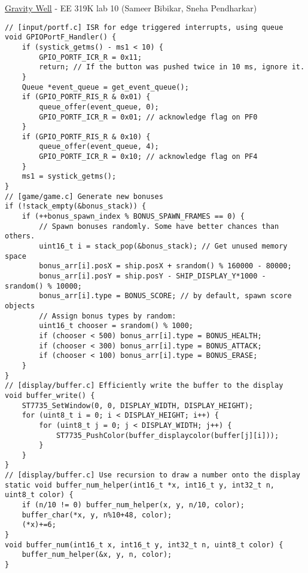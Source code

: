 \documentclass[12pt]{article}
\begin{document}
\large{\underline{Gravity Well} - EE 319K lab 10 (Sameer Bibikar, Sneha Pendharkar)}
\lstset{basicstyle=\normalsize\ttfamily,language=C,breaklines=true,columns=fullflexible,keepspaces=true}
\begin{lstlisting}
// [input/portf.c] ISR for edge triggered interrupts, using queue
void GPIOPortF_Handler() {
	if (systick_getms() - ms1 < 10) {
		GPIO_PORTF_ICR_R = 0x11;
		return; // If the button was pushed twice in 10 ms, ignore it.
	}
	Queue *event_queue = get_event_queue();
	if (GPIO_PORTF_RIS_R & 0x01) {
		queue_offer(event_queue, 0);
		GPIO_PORTF_ICR_R = 0x01; // acknowledge flag on PF0
	}
	if (GPIO_PORTF_RIS_R & 0x10) {
		queue_offer(event_queue, 4);
		GPIO_PORTF_ICR_R = 0x10; // acknowledge flag on PF4
	}
	ms1 = systick_getms();
}
// [game/game.c] Generate new bonuses
if (!stack_empty(&bonus_stack)) {
	if (++bonus_spawn_index % BONUS_SPAWN_FRAMES == 0) {
		// Spawn bonuses randomly. Some have better chances than others.
		uint16_t i = stack_pop(&bonus_stack); // Get unused memory space
		bonus_arr[i].posX = ship.posX + srandom() % 160000 - 80000;
		bonus_arr[i].posY = ship.posY - SHIP_DISPLAY_Y*1000 - srandom() % 10000;
		bonus_arr[i].type = BONUS_SCORE; // by default, spawn score objects
		// Assign bonus types by random:
		uint16_t chooser = srandom() % 1000;
		if (chooser < 500) bonus_arr[i].type = BONUS_HEALTH;
		if (chooser < 300) bonus_arr[i].type = BONUS_ATTACK;
		if (chooser < 100) bonus_arr[i].type = BONUS_ERASE;
	}
}
// [display/buffer.c] Efficiently write the buffer to the display
void buffer_write() {
	ST7735_SetWindow(0, 0, DISPLAY_WIDTH, DISPLAY_HEIGHT);
	for (uint8_t i = 0; i < DISPLAY_HEIGHT; i++) {
		for (uint8_t j = 0; j < DISPLAY_WIDTH; j++) {
			ST7735_PushColor(buffer_displaycolor(buffer[j][i]));
		}
	}
}
// [display/buffer.c] Use recursion to draw a number onto the display
static void buffer_num_helper(int16_t *x, int16_t y, int32_t n, uint8_t color) {
	if (n/10 != 0) buffer_num_helper(x, y, n/10, color);
	buffer_char(*x, y, n%10+48, color);
	(*x)+=6;
}
void buffer_num(int16_t x, int16_t y, int32_t n, uint8_t color) {
	buffer_num_helper(&x, y, n, color);
}
\end{lstlisting}
\end{document}
